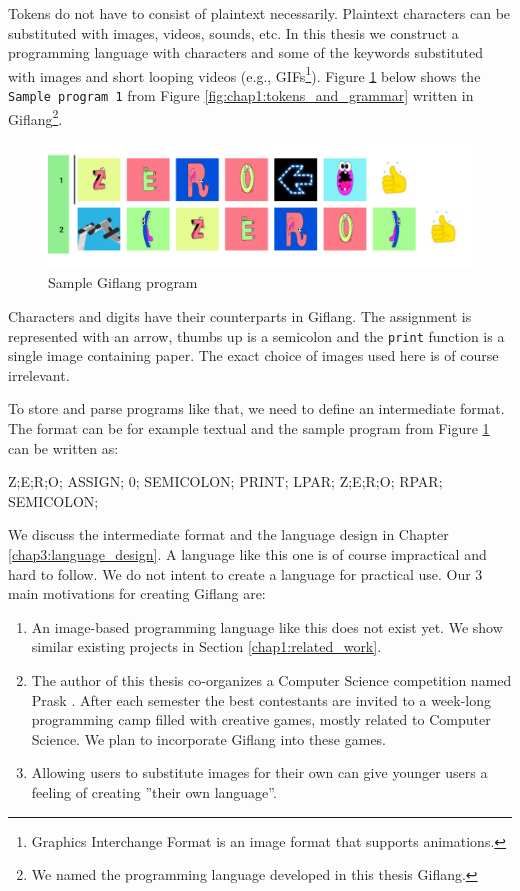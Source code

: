 Tokens do not have to consist of plaintext necessarily. Plaintext characters can be substituted with
images, videos, sounds, etc. In this thesis we construct a programming language with characters and some
of the keywords substituted with images and short looping videos (e.g., GIFs\footnote{Graphics Interchange Format is an image format that supports animations.}).
Figure \ref{fig:chap1:giflang_code} below shows the \texttt{Sample program 1} from Figure \ref{fig:chap1:tokens_and_grammar} written in
Giflang\footnote{We named the programming language developed in this thesis Giflang.}.
\begin{figure}[!hbt]
	\includegraphics[width=\textwidth]{../img/giflang_code}
	\caption{Sample Giflang program}
	\label{fig:chap1:giflang_code}
\end{figure}

Characters and digits have their counterparts in Giflang. The assignment is represented with an arrow,
thumbs up is a semicolon and the \texttt{print} function is a single image containing paper. The exact choice of images used here is of course
irrelevant.

To store and parse programs like that, we need to define an intermediate format. The format can be for example
textual and the sample program from Figure \ref{fig:chap1:giflang_code} can be written as:
\begin{code}
Z;E;R;O; ASSIGN; 0; SEMICOLON;
PRINT; LPAR; Z;E;R;O; RPAR; SEMICOLON;
\end{code}

We discuss the intermediate format and the language design in Chapter \ref{chap3:language_design}. A language like this one is of
course impractical and hard to follow. We do not intent to create a language for practical use. Our $3$ main motivations for
creating Giflang are:
\begin{enumerate}
\item An image-based programming language like this does not exist yet. We show similar existing projects in Section \ref{chap1:related_work}. 
\item The author of this thesis co-organizes a Computer Science competition named Prask \cite{Prask}. After each semester the best
contestants are invited to a week-long programming camp filled with creative games, mostly related to Computer Science. We plan to incorporate Giflang into these games.
\item Allowing users to substitute images for their own can give younger users a feeling of creating ''their own language''.
\end{enumerate}

